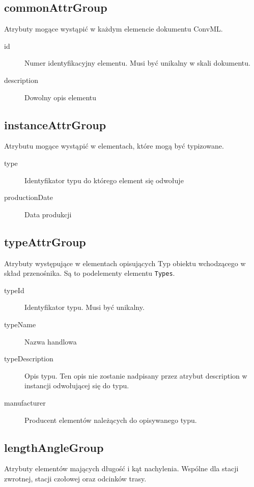 \documentclass[12pt,a4paper]{article}
\begin{document}
\subsection{commonAttrGroup}
Atrybuty mogące wystąpić w każdym elemencie dokumentu ConvML.

\begin{description}
\item[id] Numer identyfikacyjny elementu. Musi być unikalny w skali dokumentu.
\item[description] Dowolny opis elementu
\end{description}

\subsection{instanceAttrGroup}
Atrybutu mogące wystąpić w elementach, które mogą być typizowane.

\begin{description}
\item[type] Identyfikator typu do którego element się odwołuje
\item[productionDate] Data produkcji 
\end{description}

\subsection{typeAttrGroup}
Atrybuty występujące w elementach opisujących Typ obiektu wchodzącego w skład
przenośnika.  Są to podelementy elementu {\tt Types}.

\begin{description}
\item[typeId] Identyfikator typu. Musi być unikalny.
\item[typeName] Nazwa handlowa
\item[typeDescription] Opis typu. Ten opis nie zostanie nadpisany przez atrybut
  description w instancji odwołującej się do typu.
\item[manufacturer] Producent elementów należących do opisywanego typu. 
\end{description}

\subsection{lengthAngleGroup}
Atrybuty elementów mających długość i kąt nachylenia. Wspólne dla stacji
zwrotnej, stacji czołowej oraz odcinków trasy.
\end{document}

